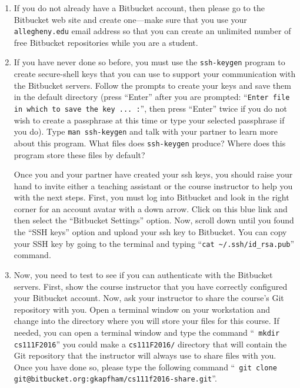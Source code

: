 \begin{enumerate}

  \item If you do not already have a Bitbucket account, then please go to the Bitbucket web site and create one---make
    sure that you use your {\tt allegheny.edu} email address so that you can create an unlimited number of free
    Bitbucket repositories while you are a student.

  \item If you have never done so before, you must use the {\tt ssh-keygen} program to create secure-shell keys that you
    can use to support your communication with the Bitbucket servers. Follow the prompts to create your keys and save
    them in the default directory (press ``Enter'' after you are prompted: ``{\tt Enter file in which to save the key
    ...  :}'', then press ``Enter'' twice if you do not wish to create a passphrase at this time or type your selected
    passphrase if you do).   Type {\tt man ssh-keygen} and talk with your partner to learn more about this program.
    What files does {\tt ssh-keygen} produce?  Where does this program store these files by default?

    Once you and your partner have created your ssh keys, you should raise your hand to invite either a teaching
    assistant or the course instructor to help you with the next steps. First, you must log into Bitbucket and look in
    the right corner for an account avatar with a down arrow.  Click on this blue link and then select the ``Bitbucket
    Settings'' option. Now, scroll down until you found the ``SSH keys'' option and upload your ssh key to Bitbucket.
    You can copy your SSH key by going to the terminal and typing ``{\tt cat \textasciitilde{}/.ssh/id\_rsa.pub}''
    command.

  \item Now, you need to test to see if you can authenticate with the Bitbucket servers.  First, show the course
    instructor that you have correctly configured your Bitbucket account.  Now, ask your instructor to share the
    course's Git repository with you.  Open a terminal window on your workstation and change into the directory where
    you will store your files for this course.  If needed, you can open a terminal window and type the command ``{\tt
    mkdir cs111F2016}'' you could make a {\tt cs111F2016/} directory that will contain the Git repository that the
    instructor will always use to share files with you.  Once you have done so, please type the following command ``{\tt
    git clone git@bitbucket.org:gkapfham/cs111f2016-share.git}''.


\end{enumerate}
